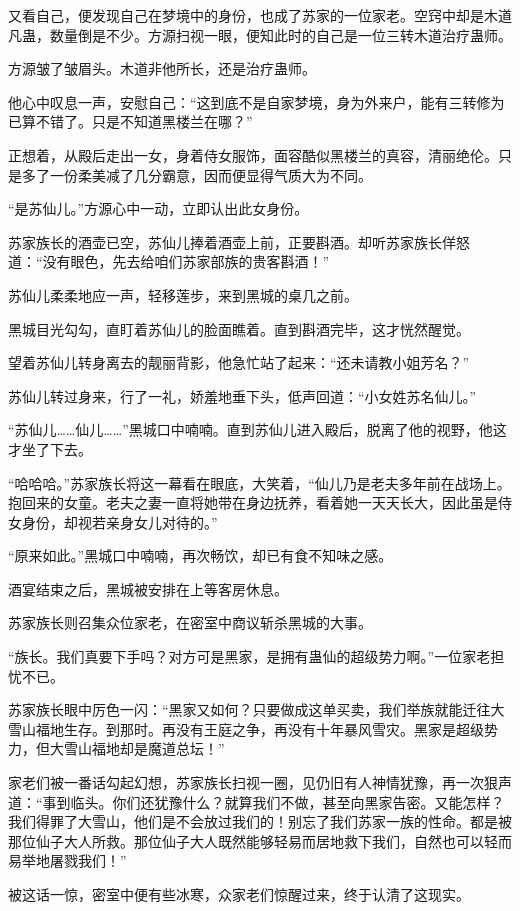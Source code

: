 \begin{this_body}
又看自己，便发现自己在梦境中的身份，也成了苏家的一位家老。空窍中却是木道凡蛊，数量倒是不少。方源扫视一眼，便知此时的自己是一位三转木道治疗蛊师。

方源皱了皱眉头。木道非他所长，还是治疗蛊师。

他心中叹息一声，安慰自己：“这到底不是自家梦境，身为外来户，能有三转修为已算不错了。只是不知道黑楼兰在哪？”

正想着，从殿后走出一女，身着侍女服饰，面容酷似黑楼兰的真容，清丽绝伦。只是多了一份柔美减了几分霸意，因而便显得气质大为不同。

“是苏仙儿。”方源心中一动，立即认出此女身份。

苏家族长的酒壶已空，苏仙儿捧着酒壶上前，正要斟酒。却听苏家族长佯怒道：“没有眼色，先去给咱们苏家部族的贵客斟酒！”

苏仙儿柔柔地应一声，轻移莲步，来到黑城的桌几之前。

黑城目光勾勾，直盯着苏仙儿的脸面瞧着。直到斟酒完毕，这才恍然醒觉。

望着苏仙儿转身离去的靓丽背影，他急忙站了起来：“还未请教小姐芳名？”

苏仙儿转过身来，行了一礼，娇羞地垂下头，低声回道：“小女姓苏名仙儿。”

“苏仙儿……仙儿……”黑城口中喃喃。直到苏仙儿进入殿后，脱离了他的视野，他这才坐了下去。

“哈哈哈。”苏家族长将这一幕看在眼底，大笑着，“仙儿乃是老夫多年前在战场上。抱回来的女童。老夫之妻一直将她带在身边抚养，看着她一天天长大，因此虽是侍女身份，却视若亲身女儿对待的。”

“原来如此。”黑城口中喃喃，再次畅饮，却已有食不知味之感。

酒宴结束之后，黑城被安排在上等客房休息。

苏家族长则召集众位家老，在密室中商议斩杀黑城的大事。

“族长。我们真要下手吗？对方可是黑家，是拥有蛊仙的超级势力啊。”一位家老担忧不已。

苏家族长眼中厉色一闪：“黑家又如何？只要做成这单买卖，我们举族就能迁往大雪山福地生存。到那时。再没有王庭之争，再没有十年暴风雪灾。黑家是超级势力，但大雪山福地却是魔道总坛！”

家老们被一番话勾起幻想，苏家族长扫视一圈，见仍旧有人神情犹豫，再一次狠声道：“事到临头。你们还犹豫什么？就算我们不做，甚至向黑家告密。又能怎样？我们得罪了大雪山，他们是不会放过我们的！别忘了我们苏家一族的性命。都是被那位仙子大人所救。那位仙子大人既然能够轻易而居地救下我们，自然也可以轻而易举地屠戮我们！”

被这话一惊，密室中便有些冰寒，众家老们惊醒过来，终于认清了这现实。


\end{this_body}

